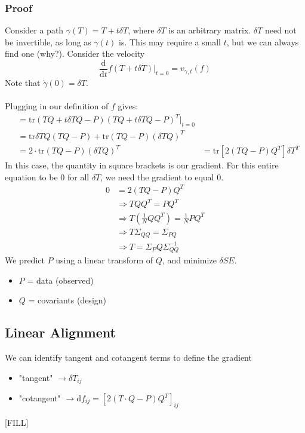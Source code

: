 \documentclass[10pt]{article}
\begin{document}
\subsubsection*{Proof}
Consider a path $\gamma(T) = T + t\delta T$, where $\delta T$ is an arbitrary matrix.  $\delta T$ need not be invertible, as long as $\gamma(t)$ is.  This may require a small $t$, but we can always find one (why?).  Consider the velocity
\[\frac{\text{d}}{\text{d}t} f(T + t\delta T) \bigg|_{t = 0} = v_{\gamma, t} (f)\]
Note that $\dot{\gamma}(0) = \delta T$.\\\\
Plugging in our definition of $f$ gives:
\begin{align*}
    &= \text{tr}(TQ + t\delta TQ - P)(TQ + t\delta TQ - P)^T \bigg|_{t = 0}\\
    &= \text{tr} \delta TQ (TQ - P) + \text{tr} (TQ - P) (\delta TQ)^T\\
    &= 2 \cdot \text{tr} (TQ - P)(\delta TQ)^T
    &= \text{tr} \left[2(TQ - P) Q^T\right] \delta T^T
\end{align*}
In this case, the quantity in square brackets is our gradient.  For this entire equation to be 0 for all $\delta T$, we need the gradient to equal 0.
\begin{align*}
    0 &= 2(TQ - P)Q^T\\
    &\Rightarrow TQQ^T = PQ^T\\
    &\Rightarrow T(\frac{1}{N} QQ^T) = \frac{1}{N} PQ^T\\
    &\Rightarrow T \Sigma_{QQ} = \Sigma_{PQ}\\
    &\Rightarrow T = \Sigma_PQ \Sigma_{QQ}^{-1}
\end{align*}
We predict $P$ using a linear transform of $Q$, and minimize $\delta SE$.
\begin{itemize}
    \item $P$ = data (observed)
    \item $Q$ = covariants (design)
\end{itemize}

\subsection*{Linear Alignment}
We can identify tangent and cotangent terms to define the gradient
\begin{itemize}
    \item "tangent" $\rightarrow \delta T_{ij}$
    \item "cotangent" $\rightarrow \text{d}f_{ij} = [2(T \cdot Q - P) Q^T]_{ij}$
\end{itemize}
[FILL]
\end{document}
